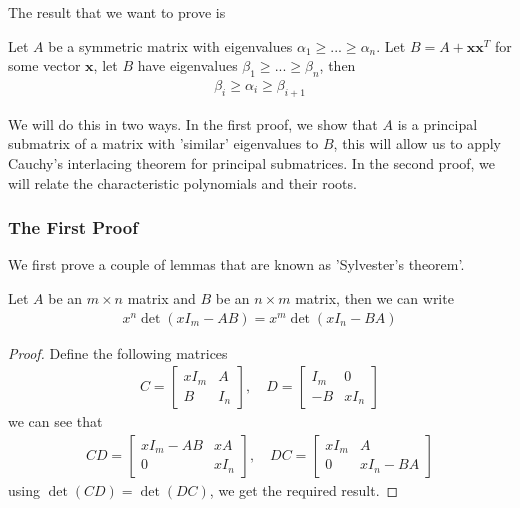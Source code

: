 \documentclass{math}
\renewcommand{\vec}[1]{\boldsymbol{#1}}
\begin{document}
The result that we want to prove is

\begin{theorem}\label{thm:cauchy-rank-one}
    Let $A$ be a symmetric matrix with eigenvalues $\alpha_1 \geq ... \geq \alpha_n$.
    Let $B = A + \vec{x} \vec{x}^T$ for some vector $\vec{x}$, let $B$ have eigenvalues $\beta_1 \geq ... \geq \beta_n$, then
    \begin{align*}
        \beta_i \geq \alpha_i \geq \beta_{i + 1}
    \end{align*}
\end{theorem}

We will do this in two ways. In the first proof, we show that $A$ is a principal submatrix of a matrix with 'similar' eigenvalues to $B$,
this will allow us to apply Cauchy's interlacing theorem for principal submatrices.
In the second proof, we will relate the characteristic polynomials and their roots.

\subsubsection{The First Proof}

We first prove a couple of lemmas that are known as 'Sylvester's theorem'.

\begin{lemma}\label{lemma:sylvester}
    Let $A$ be an $m \times n$ matrix and $B$ be an $n \times m$ matrix, then we can write
    \begin{align*}
        x^n\det(xI_m - AB) = x^m\det(xI_n - BA)
    \end{align*}
\end{lemma}
\begin{proof}
    Define the following matrices
    \begin{align*}
        C = \begin{bmatrix}
                xI_m & A   \\
                B    & I_n
            \end{bmatrix},\quad
        D = \begin{bmatrix}
                I_m & 0    \\
                -B  & xI_n
            \end{bmatrix}
    \end{align*}
    we can see that
    \begin{align*}
        CD = \begin{bmatrix}
                 xI_m - AB & xA   \\
                 0         & xI_n
             \end{bmatrix},\quad
        DC = \begin{bmatrix}
                 xI_m & A         \\
                 0    & xI_n - BA
             \end{bmatrix}
    \end{align*}
    using $\det(CD) = \det(DC)$, we get the required result.
\end{proof}
\end{document}
